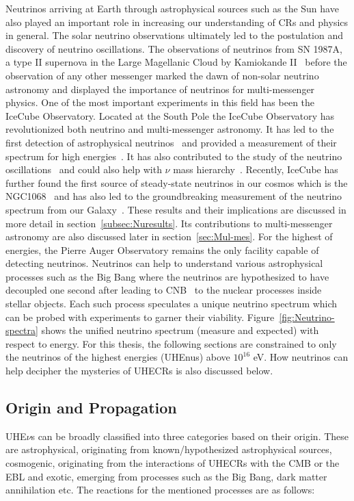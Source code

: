Neutrinos arriving at Earth through astrophysical sources such as the Sun have also played an important role in increasing our understanding of \glspl{CR} and physics in general. The solar neutrino observations ultimately led to the postulation and discovery of neutrino oscillations. The observations of neutrinos from SN 1987A, a type II supernova in the Large Magellanic Cloud by Kamiokande II~\cite{PhysRevLett.58.1490} before the observation of any other messenger marked the dawn of non-solar neutrino astronomy and displayed the importance of neutrinos for multi-messenger physics. One of the most important experiments in this field has been the IceCube Observatory. Located at the South Pole the IceCube Observatory has revolutionized both neutrino and multi-messenger astronomy. It has led to the first detection of astrophysical neutrinos~\cite{PhysRevLett.111.021103} and provided a measurement of their spectrum for high energies~\cite{doi:10.1126/science.1242856}. It has also contributed to the study of the neutrino oscillations~\cite{Abbasi_2023_Oscillation} and could also help with $\nu$ mass hierarchy~\cite{psf2023008007}. Recently, IceCube has further found the first source of steady-state neutrinos in our cosmos which is the NGC1068~\cite{Icecube_2022} and has also led to the groundbreaking measurement of the neutrino spectrum from our Galaxy~\cite{Galactic_plane_nu_2023}. These results and their implications are discussed in more detail in section~\ref{subsec:Nuresults}. Its contributions to multi-messenger astronomy are also discussed later in section~\ref{sec:Mul-mes}. For the highest of energies, the Pierre Auger Observatory remains the only facility capable of detecting neutrinos. 
Neutrinos can help to understand various astrophysical processes such as the Big Bang where the neutrinos are hypothesized to have decoupled one second after leading to \gls{CNB}~\cite{scott2024cosmicneutrinobackground} to the nuclear processes inside stellar objects. Each such process speculates a unique neutrino spectrum which can be probed with experiments to garner their viability. Figure~\ref{fig:Neutrino-spectra} shows the unified neutrino spectrum (measure and expected) with respect to energy. For this thesis, the following sections are constrained to only the neutrinos of the highest energies (\glspl{UHEnu}) above $10^{16}$ eV. How neutrinos can help decipher the mysteries of \glspl{UHECR} is also discussed below.

\subsection{Origin and Propagation}
\label{subsec:nuorig}
UHE$\nu$s can be broadly classified into three categories based on their origin. These are astrophysical, originating from known/hypothesized astrophysical sources, cosmogenic, originating from the interactions of \glspl{UHECR} with the \gls{CMB} or the \gls{EBL} and exotic, emerging from processes such as the Big Bang, dark matter annihilation etc. The reactions for the mentioned processes are as follows:



